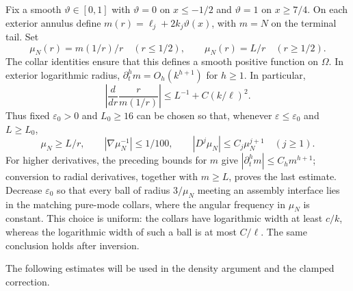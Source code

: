 \documentclass[11pt,twoside,leqno]{article}
\numberwithin{equation}{section}
\theoremstyle{definition}
\theoremstyle{remark}
\newcommand{\eps}{\varepsilon}
\newcommand{\Om}{\Omega}
\begin{document}
Fix a smooth $\vartheta\in[0,1]$ with $\vartheta=0$ on $x\le-1/2$
and $\vartheta=1$ on $x\ge7/4$. On each exterior annulus define
$m(r)=\ell_j+2k_j\vartheta(x)$, with $m=N$ on the terminal tail. Set
\begin{equation}\label{eq:frequency}
 \mu_N(r)=m(1/r)/r\quad(r\le1/2),\qquad
 \mu_N(r)=L/r\quad(r\ge1/2).
\end{equation}
The collar identities ensure that this defines a smooth positive
function on $\Om$.
In exterior logarithmic radius, $\partial_t^hm=O_h(k^{h+1})$ for
$h\ge1$. In particular,
\[
 \left|\frac{d}{dr}\frac{r}{m(1/r)}\right|
 \le L^{-1}+C(k/\ell)^2.
\]
Thus fixed $\eps_0>0$ and $L_0\ge16$ can be chosen so that, whenever
$\eps\le\eps_0$ and $L\ge L_0$,
\begin{equation}\label{eq:frequency-jets}
 \mu_N\ge L/r,\qquad |\nabla\mu_N^{-1}|\le1/100,\qquad
 |D^j\mu_N|\le C_j\mu_N^{j+1}\quad(j\ge1).
\end{equation}
For higher derivatives, the preceding bounds for $m$ give
$|\partial_t^hm|\le C_hm^{h+1}$; conversion to radial derivatives,
together with $m\ge L$, proves the last estimate. Decrease $\eps_0$
so that every ball of radius $3/\mu_N$ meeting an assembly interface
lies in the matching pure-mode collars, where the angular frequency
in $\mu_N$ is constant. This choice is uniform: the collars have
logarithmic width at least $c/k$, whereas the logarithmic width of
such a ball is at most $C/\ell$. The same conclusion holds after
inversion.

The following estimates will be used in the density argument and the
clamped correction.
\end{document}
